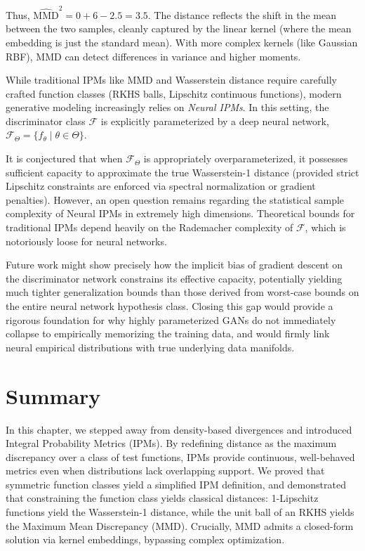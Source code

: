 Thus, $\widehat{\text{MMD}}^2 = 0 + 6 - 2.5 = 3.5$. 
The distance reflects the shift in the mean between the two samples, cleanly captured by the linear kernel (where the mean embedding is just the standard mean). With more complex kernels (like Gaussian RBF), MMD can detect differences in variance and higher moments.

\begin{horizon}
While traditional IPMs like MMD and Wasserstein distance require carefully crafted function classes (RKHS balls, Lipschitz continuous functions), modern generative modeling increasingly relies on \textit{Neural IPMs}. In this setting, the discriminator class $\mathcal{F}$ is explicitly parameterized by a deep neural network, $\mathcal{F}_\Theta = \{ f_\theta \mid \theta \in \Theta \}$. 

It is conjectured that when $\mathcal{F}_\Theta$ is appropriately overparameterized, it possesses sufficient capacity to approximate the true Wasserstein-1 distance (provided strict Lipschitz constraints are enforced via spectral normalization or gradient penalties). However, an open question remains regarding the statistical sample complexity of Neural IPMs in extremely high dimensions. Theoretical bounds for traditional IPMs depend heavily on the Rademacher complexity of $\mathcal{F}$, which is notoriously loose for neural networks. 

Future work might show precisely how the implicit bias of gradient descent on the discriminator network constrains its effective capacity, potentially yielding much tighter generalization bounds than those derived from worst-case bounds on the entire neural network hypothesis class. Closing this gap would provide a rigorous foundation for why highly parameterized GANs do not immediately collapse to empirically memorizing the training data, and would firmly link neural empirical distributions with true underlying data manifolds.
\end{horizon}

\section{Summary}
In this chapter, we stepped away from density-based divergences and introduced Integral Probability Metrics (IPMs). By redefining distance as the maximum discrepancy over a class of test functions, IPMs provide continuous, well-behaved metrics even when distributions lack overlapping support. We proved that symmetric function classes yield a simplified IPM definition, and demonstrated that constraining the function class yields classical distances: 1-Lipschitz functions yield the Wasserstein-1 distance, while the unit ball of an RKHS yields the Maximum Mean Discrepancy (MMD). Crucially, MMD admits a closed-form solution via kernel embeddings, bypassing complex optimization.

